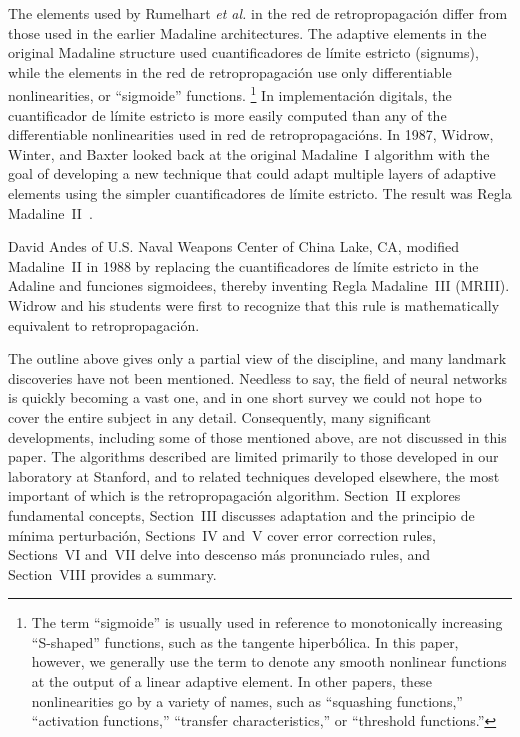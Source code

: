 \documentclass[10pt,twocolumn]{article}
\begin{document}
The elements used by Rumelhart \textit{et al.} in the red de retropropagación
differ from those used in the earlier Madaline architectures. The adaptive
elements in the original Madaline structure used cuantificadores de límite estricto
(signums), while the elements in the red de retropropagación use only
differentiable nonlinearities, or ``sigmoide'' functions.%
\footnote{The term ``sigmoide'' is usually used in reference to monotonically
increasing ``S-shaped'' functions, such as the tangente hiperbólica. In this
paper, however, we generally use the term to denote any smooth nonlinear
functions at the output of a linear adaptive element. In other papers, these
nonlinearities go by a variety of names, such as ``squashing functions,''
``activation functions,'' ``transfer characteristics,'' or ``threshold
functions.''}
In implementación digitals, the cuantificador de límite estricto is more easily computed
than any of the differentiable nonlinearities used in red de retropropagacións.
In 1987, Widrow, Winter, and Baxter looked back at the original Madaline~I
algorithm with the goal of developing a new technique that could adapt multiple
layers of adaptive elements using the simpler cuantificadores de límite estricto. The
result was Regla Madaline~II~\cite{wwb}.

David Andes of U.S. Naval Weapons Center of China Lake, CA, modified
Madaline~II in 1988 by replacing the cuantificadores de límite estricto in the Adaline
and funciones sigmoidees, thereby inventing Regla Madaline~III (MRIII). Widrow and
his students were first to recognize that this rule is mathematically
equivalent to retropropagación.

The outline above gives only a partial view of the discipline, and many
landmark discoveries have not been mentioned. Needless to say, the field of
neural networks is quickly becoming a vast one, and in one short survey we could
not hope to cover the entire subject in any detail. Consequently, many
significant developments, including some of those mentioned above, are not
discussed in this paper. The algorithms described are limited primarily to
those developed in our laboratory at Stanford, and to related techniques
developed elsewhere, the most important of which is the retropropagación
algorithm. Section~II explores fundamental concepts, Section~III discusses
adaptation and the principio de mínima perturbación, Sections~IV and~V cover error
correction rules, Sections~VI and~VII delve into descenso más pronunciado rules, and
Section~VIII provides a summary.
\end{document}
